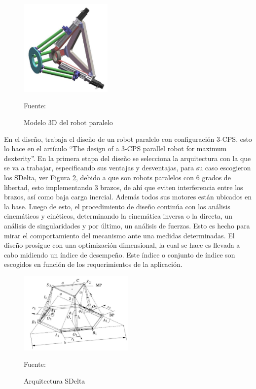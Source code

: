 \begin{figure}[hbt!]
    \centering
    \includegraphics[width=0.4\textwidth]{Cap2_DisenoEspecificaciones/Figura/Xu2017.pdf}
    \caption{Modelo 3D del robot paralelo}{Fuente: \citep{xu2017dynamic}}
    \label{fig:Xu2017}
\end{figure}

En el diseño, \cite{li2018design} trabaja el diseño de un robot paralelo con configuración 3-CPS, esto lo hace en el artículo \enquote{The design of a 3-CPS parallel robot for maximum dexterity}. En la primera etapa del diseño se selecciona la arquitectura con la que se va a trabajar, especificando sus ventajas y desventajas, para su caso escogieron los SDelta, ver Figura \ref{fig:Li2018}, debido a que son robots paralelos con 6 grados de libertad, esto implementando 3 brazos, de ahí que eviten interferencia entre los brazos, así como baja carga inercial. Además todos sus motores están ubicados en la base. Luego de esto, el procedimiento de diseño continúa con los análisis cinemáticos y cinéticos, determinando la cinemática inversa o la directa, un análisis de singularidades y por último, un análisis de fuerzas. Esto es hecho para mirar el comportamiento del mecanismo ante una medidas determinadas. El diseño prosigue con una optimización dimensional, la cual se hace es llevada a cabo midiendo un índice de desempeño. Este índice o conjunto de índice son escogidos en función de los requerimientos de la aplicación.

\begin{figure}[hbt!]
    \centering
    \includegraphics[width=0.5\textwidth]{Cap2_DisenoEspecificaciones/Figura/Li2018.pdf}
    \caption{Arquitectura SDelta}{Fuente: \citep{li2018design}}
    \label{fig:Li2018}
\end{figure}


